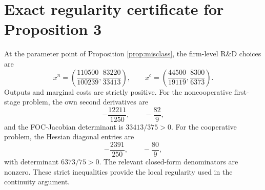 \section{Exact regularity certificate for Proposition 3}
At the parameter point of Proposition \ref{prop:misclass}, the firm-level R\&D choices are
\[
 x^n=\left(\frac{110500}{100239},\frac{83220}{33413}\right),\qquad
 x^c=\left(\frac{44500}{19119},\frac{8300}{6373}\right).
\]
Outputs and marginal costs are strictly positive. For the noncooperative first-stage problem, the own second derivatives are
\[
-\frac{12211}{1250},\qquad -\frac{82}{9},
\]
and the FOC-Jacobian determinant is $33413/375>0$. For the cooperative problem, the Hessian diagonal entries are
\[
-\frac{2391}{250},\qquad -\frac{80}{9},
\]
with determinant $6373/75>0$. The relevant closed-form denominators are nonzero. These strict inequalities provide the local regularity used in the continuity argument.
